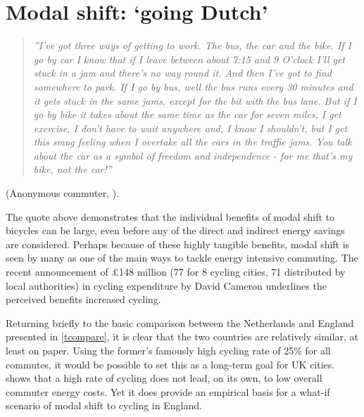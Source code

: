 \section{Modal shift: `going Dutch'} 
\label{smshift} %
\begin{quote}
\textit{''I've got three ways of getting to work. The bus, the car and the bike.
If I go
by car I know that if I leave between about 7:15 and 9 O’clock I'll get stuck in
a jam and there's no way round it. And then I've got to find somewhere to park.
If I go by bus, well the bus runs every 30 minutes and it gets stuck in the same
jams, except for the bit with the bus lane. But if I go by bike it takes about
the same time as the car for seven miles, I get exercise, I don’t have to wait
anywhere and, I know I shouldn't, but
I get this smug feeling when I overtake all the cars in the traffic jams. You
talk about the car as a symbol of freedom and independence - for me that’s my
bike, not the car!''}\end{quote}
\begin{flushright}
  (Anonymous commuter, \citealp[p.~61]{Goodwin1991a}).
\end{flushright} 

The quote above demonstrates that the individual benefits of modal shift
to bicycles can be large, even before any of the direct and indirect energy
savings are considered. Perhaps because of these highly tangible benefits,
modal shift is seen by many as one of the main
ways to tackle energy intensive commuting. The recent announcement of
\pounds148 million (77 for 8 cycling cities, 71 distributed by local
authorities) in cycling expenditure by David Cameron underlines the perceived
benefits increased cycling.

Returning briefly to the basic comparison between the Netherlands and England
presented in \cref{tcompare}, it is clear that the two countries are relatively
similar, at least on paper. Using the former's famously high cycling rate of
25\% for all commutes, it would be possible to set this as a long-term goal for
UK cities.  shows that a high rate of cycling does not
lead, on its own, to low overall commuter energy costs. Yet it does provide an
empirical basis for a what-if scenario of modal shift to cycling in England.

